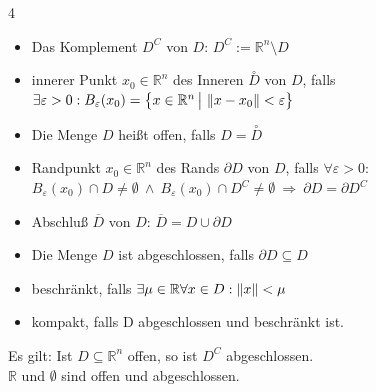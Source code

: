 \documentclass[6pt,a4paper]{scrartcl}
\newcommand{\norm}[2][\relax]{\ifx#1\relax \ensuremath{\left\Vert#2\right\Vert}\else \ensuremath{\left\Vert#2\right\Vert_{#1}}\fi}
\begin{document}
\begin{multicols*}{4}
    \begin{itemize}\itemsep0pt
        \item Das Komplement $D^C$ von $D$: $D^C := \mathbb R^n \setminus D$
        \item innerer Punkt $x_0 \in \mathbb R^n$ des Inneren $\overset{\circ}{D}$ von $D$, falls \\
              $\exists \varepsilon > 0: B_\varepsilon (x_0) =
                  {\ensuremath{\bigl\{ \bigl. x\in \mathbb R^n \, \bigr| \, \norm{x-x_0} < \varepsilon \bigr\}}}$
        \item Die Menge $D$ heißt offen, falls $D=\overset{\circ}{D}$
        \item Randpunkt $x_0 \in \mathbb R^n$ des Rands $\partial D$ von $D$, falls $\forall \varepsilon > 0:$ \\
              $B_\varepsilon(x_0) \cap D \ne \emptyset \ \land \ B_\varepsilon(x_0) \cap D^C \ne \emptyset \ \Rightarrow \ \partial D = \partial D^C$
        \item Abschluß $\overline D$ von $D$: $\overline{D}=D \cup \partial D$
        \item Die Menge $D$ ist abgeschlossen, falls $\partial D \subseteq D$
        \item beschränkt, falls $\exists \mu \in \mathbb R \forall x \in D: \norm{x} < \mu$
        \item kompakt, falls D abgeschlossen und beschränkt ist.
    \end{itemize}
    Es gilt: Ist $D \subseteq \mathbb R^n$ offen, so ist $D^C$ abgeschlossen. \\
    $\mathbb R$ und $\emptyset$ sind offen und abgeschlossen.

    \vspace{10em}



\end{multicols*}
\label{LastPage}

\end{document}

